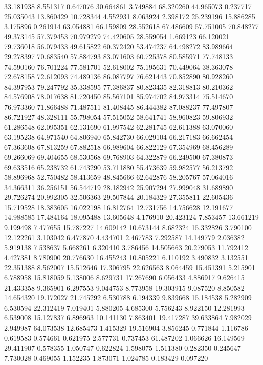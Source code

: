 33.181938
8.551317
0.647076
30.664861
3.749884
68.320260
44.965073
0.237717
25.035043
13.860429
10.728344
4.552931
8.063924
2.398172
25.239196
15.886285
3.175896
0.261914
63.054881
66.159809
28.552618
67.486609
57.751005
70.848277
49.373145
57.379453
70.979279
74.420605
28.559054
1.669123
66.120021
79.736018
56.079433
49.615822
60.372420
53.474237
64.498272
83.989664
29.278397
70.683540
57.884793
83.071603
60.725378
80.585971
77.748133
74.590160
76.701224
77.581701
52.618002
75.195631
70.449064
38.363078
72.678158
72.612093
74.489136
86.087797
76.621443
70.852890
80.928260
84.397953
79.247792
35.338595
77.386837
80.823435
82.318813
80.210362
84.576908
78.017638
81.720450
85.567101
85.974702
84.973314
75.514670
76.973360
71.866488
71.487511
81.408445
86.444382
87.088237
77.497807
86.721927
48.328111
55.798054
57.515052
58.641741
58.960823
59.806932
61.286548
62.095351
62.131690
61.997542
62.281745
62.611388
63.070060
63.195238
64.971540
64.806940
65.842730
66.029104
66.217183
66.662454
67.363608
67.813259
67.882518
66.989604
66.822129
67.354969
68.456289
69.266069
69.404655
68.530568
69.768903
64.322879
66.249500
67.380873
69.633516
65.238732
61.743290
53.711880
55.473639
59.982577
56.213792
58.896968
52.750482
58.413659
48.845666
62.642876
58.205767
57.064016
34.366311
36.256151
56.544719
28.182942
25.907294
27.999048
31.689890
29.726274
20.992305
32.506363
29.507844
20.184329
27.355811
22.605436
15.719528
18.383605
16.022198
16.812764
12.731756
14.756628
12.191677
14.988585
17.484164
18.095488
13.605648
4.176910
20.423124
7.853457
13.661219
9.199498
7.477655
15.787227
14.609142
10.673144
8.682324
15.332826
3.790100
12.122261
3.103042
6.477870
4.434701
2.467783
7.292587
14.149779
2.036382
5.919138
7.538637
5.668261
6.320410
3.786456
14.505663
20.279053
11.792412
4.427381
8.780900
20.776630
16.455243
10.805221
6.110192
3.490832
3.132551
22.351388
8.562007
15.512646
17.306795
22.626563
8.064459
15.451391
5.215901
6.788958
15.818059
5.138006
8.629731
17.267690
6.056433
4.886917
9.626415
21.433358
9.365901
6.297553
9.044753
8.773958
19.303915
9.087520
8.850582
14.654320
19.172027
21.745292
6.530788
6.194339
9.839668
15.184538
5.282909
6.530594
22.312419
7.019401
5.880205
4.685300
5.756243
8.922150
12.281993
6.539008
15.127837
6.896963
10.141130
7.863401
19.417287
39.633864
7.982029
2.949987
64.073538
12.685473
1.415329
19.516904
3.856245
0.771844
1.116786
0.619583
0.574661
0.621975
2.577731
0.737453
61.487202
1.066626
16.149569
29.411907
0.578355
1.050747
0.622824
1.598075
1.511380
0.282350
0.245647
7.730028
0.469055
1.152235
1.873071
1.024785
0.183429
0.097220
